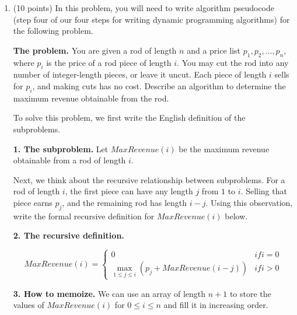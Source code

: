 \documentclass[11pt]{article}
\begin{document}
\begin{enumerate}
    \item (10 points) In this problem, you will need to write algorithm pseudocode  
    (step four of our four steps for writing dynamic programming algorithms)
    for the following problem.

\textbf{The problem.} You are given a rod of length $n$ and a price list
$p_1, p_2, \ldots, p_n$, where $p_i$ is the price of a rod piece of length $i$.
You may cut the rod into any number of integer-length pieces, or leave it
uncut. Each piece of length $i$ sells for $p_i$, and making cuts has no cost.
Describe an algorithm to determine the maximum revenue obtainable from the rod.

To solve this problem, we first write the English definition of the subproblems.

    \textbf{1. The subproblem.} Let $MaxRevenue(i)$ be the maximum revenue obtainable
    from a rod of length $i$.

    Next, we think about the recursive relationship between subproblems. For a rod
    of length $i$, the first piece can have any length $j$ from $1$ to $i$. Selling
    that piece earns $p_j$, and the remaining rod has length $i-j$. Using this
    observation, write the formal recursive definition for $MaxRevenue(i)$ below.

    \textbf{2. The recursive definition.} 

    \begin{equation*}
        MaxRevenue(i) =
        \begin{cases}
            0 & if i = 0 \\
            \max_{1 \leq j \leq i} (p_j + MaxRevenue(i-j)) & if i > 0
        \end{cases}
    \end{equation*}

    \textbf{3. How to memoize.} We can use an array of length $n+1$ to store the
    values of $MaxRevenue(i)$ for $0 \leq i \leq n$ and fill it in increasing order.



\end{enumerate}
\end{document}
